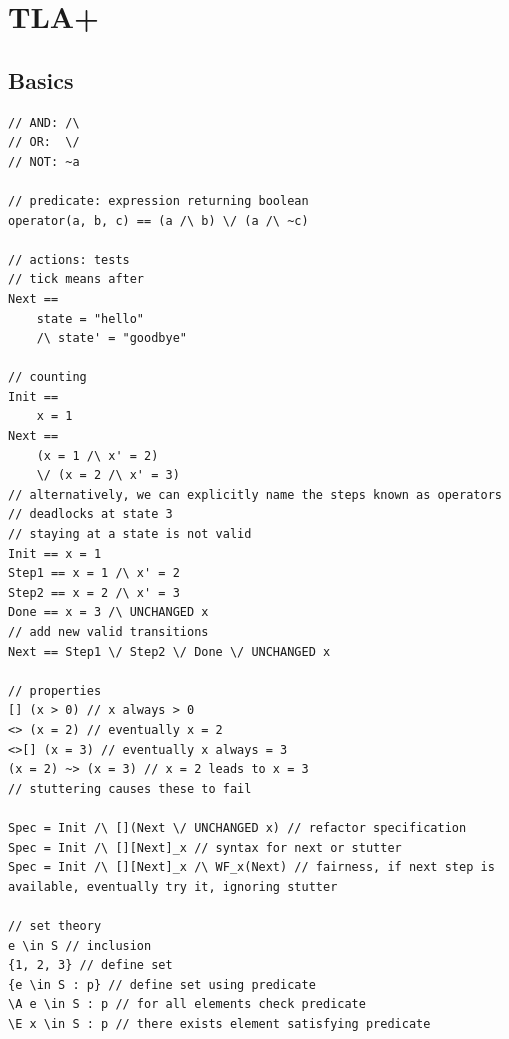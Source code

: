 \documentclass{article}
\begin{document}
\section{TLA+}
\subsection{Basics}
\begin{lstlisting}
// AND: /\
// OR:  \/
// NOT: ~a

// predicate: expression returning boolean
operator(a, b, c) == (a /\ b) \/ (a /\ ~c)

// actions: tests
// tick means after
Next ==
    state = "hello"
    /\ state' = "goodbye"

// counting
Init ==
    x = 1
Next ==
    (x = 1 /\ x' = 2)
    \/ (x = 2 /\ x' = 3)
// alternatively, we can explicitly name the steps known as operators
// deadlocks at state 3
// staying at a state is not valid
Init == x = 1
Step1 == x = 1 /\ x' = 2
Step2 == x = 2 /\ x' = 3
Done == x = 3 /\ UNCHANGED x
// add new valid transitions
Next == Step1 \/ Step2 \/ Done \/ UNCHANGED x

// properties
[] (x > 0) // x always > 0
<> (x = 2) // eventually x = 2
<>[] (x = 3) // eventually x always = 3
(x = 2) ~> (x = 3) // x = 2 leads to x = 3
// stuttering causes these to fail

Spec = Init /\ [](Next \/ UNCHANGED x) // refactor specification
Spec = Init /\ [][Next]_x // syntax for next or stutter
Spec = Init /\ [][Next]_x /\ WF_x(Next) // fairness, if next step is available, eventually try it, ignoring stutter

// set theory
e \in S // inclusion
{1, 2, 3} // define set
{e \in S : p} // define set using predicate
\A e \in S : p // for all elements check predicate
\E x \in S : p // there exists element satisfying predicate
\end{lstlisting}
\end{document}
